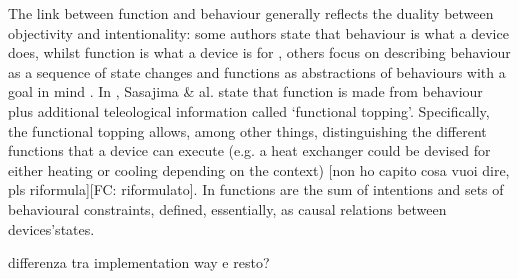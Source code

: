 \documentclass[sw]{iosart2x}
\newcommand{\quotes}[1]{`#1'}
\newcommand{\TODO}[1]{{\color{red} #1}}
\begin{document}
The link between function and behaviour generally reflects the duality between objectivity and intentionality: some authors state that behaviour is what a device does, whilst function is what a device is for \cite{kleer_qualitative_1984}, others focus on describing behaviour as a sequence of state changes and functions as abstractions of behaviours with a goal in mind \cite{umedaFunctionBehaviourStructure1990}.  
In \cite{sasajimaFBRLFunctionBehavior1995, sasajimaInvestigationDomainOntology1994}, Sasajima \& al. state that function is made from behaviour plus additional teleological information called \quotes{functional topping}.
Specifically, the functional topping allows, among other things, distinguishing the different functions that a device can execute (e.g. a heat exchanger could be devised for either heating or cooling depending on the context)%
\TODO{[non ho capito cosa vuoi dire, pls riformula][FC: riformulato]}. 
In \cite{chandrasekaranFunctionDeviceRepresentation2000} functions are the sum of intentions and sets of behavioural constraints, defined, essentially, as causal relations between devices'states.

\TODO{differenza tra implementation way e resto?}
\end{document}
